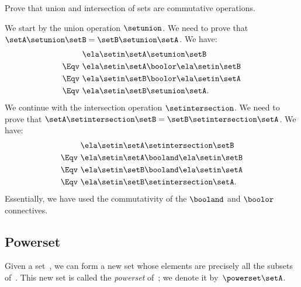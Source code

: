 \begin{exercise}
    Prove that union and intersection of sets are commutative operations.
\end{exercise}

\begin{solution}
    We start by the union operation $\setunion$.
    We need to prove that $\setA \setunion \setB = \setB \setunion \setA$.
    We have:
    \begin{equation*}
        \begin{split}
                    & \ela \setin \setA \setunion \setB           \\
            \Eqv \  & \ela \setin \setA \boolor \ela \setin \setB \\
            \Eqv \  & \ela \setin \setB \boolor \ela \setin \setA \\
            \Eqv \  & \ela \setin \setB \setunion \setA.
        \end{split}
    \end{equation*}
    We continue with the intersection operation $\setintersection$.
    We need to prove that $\setA \setintersection \setB = \setB \setintersection \setA$.
    We have:
    \begin{equation*}
        \begin{split}
                    & \ela \setin \setA \setintersection \setB     \\
            \Eqv \  & \ela \setin \setA \booland \ela \setin \setB \\
            \Eqv \  & \ela \setin \setB \booland \ela \setin \setA \\
            \Eqv \  & \ela \setin \setB \setintersection \setA.
        \end{split}
    \end{equation*}
    Essentially, we have used the commutativity of the $\booland$ and $\boolor$ connectives.
\end{solution}

\subsection{Powerset}
\label{sec:power-set}

\begin{ctdefinition}
    \label{def:power-set}
    Given a set~\setA, we can form a new set whose elements are precisely all the subsets of~\setA.
    This new set is called the \emph{powerset} of~\setA; we denote it by~$\powerset \setA$.
\end{ctdefinition}

